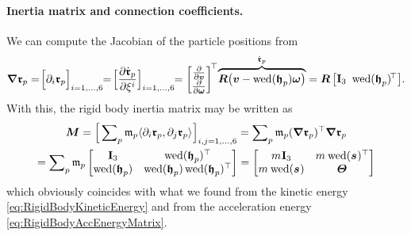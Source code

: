 \paragraph{Inertia matrix and connection coefficients.}
We can compute the Jacobian of the particle positions from
\begin{align}
 \differential \particlePos{\PidxI}
 =\! \Big[ \dirDiff{\LidxI} \particlePos{\PidxI} \Big]_{\LidxI=1,\ldots,6}\!\!
 =\! \Big[ \pdiff[\particlePosd{\PidxI}]{\sysVelCoeff{\LidxI}} \Big]_{\LidxI=1,\ldots,6}\!\!
 = \begin{bmatrix} \pdiff{\v} \\ \pdiff{\w} \end{bmatrix}^{\!\top} \!\overbrace{\R \big( \v - \wedOp(\particleBodyPos{\PidxI}) \w \big)}^{\particlePosd{\PidxI}}
 = \R \begin{bmatrix} \idMat[3] \ \wedOp(\particleBodyPos{\PidxI})^{\!\top} \end{bmatrix}\!.
\end{align}
With this, the rigid body inertia matrix may be written as
\begin{multline}
 \sysInertiaMat = \Big[ \sumParticles \particleMass{\PidxI} \sProd{\dirDiff{\LidxI} \particlePos{\PidxI}}{\dirDiff{\LidxII} \particlePos{\PidxI}} \Big]_{\LidxI,\LidxII=1,\ldots,6}
 = \sumParticles \particleMass{\PidxI} (\differential \particlePos{\PidxI})^\top \differential \particlePos{\PidxI}
\\
 = \sumParticles \particleMass{\PidxI} \begin{bmatrix} \idMat[3] & \wedOp(\particleBodyPos{\PidxI})^\top \\ \wedOp(\particleBodyPos{\PidxI}) & \wedOp(\particleBodyPos{\PidxI})\wedOp(\particleBodyPos{\PidxI})^\top \end{bmatrix}
 = \begin{bmatrix} \bodyMass{}{}\idMat[3] & \bodyMass{}{} \wedOp(\bodyCOM{}{})^\top \\ \bodyMass{}{} \wedOp(\bodyCOM{}{}) & \bodyMOI{}{} \end{bmatrix}
\end{multline}
which obviously coincides with what we found from the kinetic energy \eqref{eq:RigidBodyKineticEnergy} and from the acceleration energy \eqref{eq:RigidBodyAccEnergyMatrix}.

